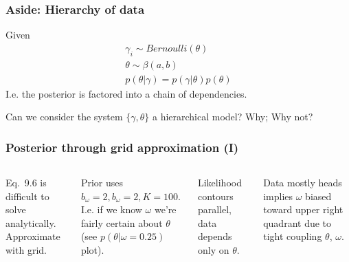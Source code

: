 \documentclass[usenames,dvipsnames,table]{beamer}
\begin{document}
\begin{frame}
\frametitle{Aside: Hierarchy of data}
Given
\begin{align*}
\gamma_i \sim Bernoulli(\theta)\tag{9.2}\\
\theta \sim \beta(a, b)\tag{9.3}\\
p(\theta|\gamma) = p(\gamma|\theta)p(\theta)
\end{align*}
I.e. the posterior is factored into a chain of dependencies.

\vspace{1em}
Can we consider the system $\{\gamma, \theta\}$ a hierarchical model? Why; Why not? 
\end{frame}

\begin{frame}
\frametitle{Posterior through grid approximation (I)}
\begin{columns}[c]
Eq.~9.6 is difficult to solve analytically. Approximate with grid.

\vspace{1em}
Prior uses $b_\omega=2, b_\omega=2, K=100$. I.e. if we know $\omega$ we're fairly certain about $\theta$ (see $p(\theta|\omega=0.25)$ plot).

\vspace{1em}
Likelihood contours parallel, data depends only on $\theta$.

\vspace{1em}
Data mostly heads implies $\omega$ biased toward upper right quadrant due to tight coupling $\theta$, $\omega$.


\end{columns}
\end{frame}
\end{document}
